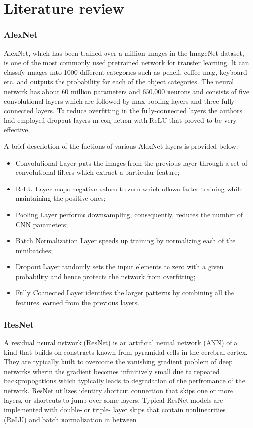 \documentclass[doc/report.tex]{subfiles}
\begin{document}
\section{Literature review}

\subsubsection{AlexNet}
AlexNet\cite{Alex}, which has been trained over a million images in the
ImageNet dataset, is one of the most commonly used pretrained network for
transfer learning. It can classify images into 1000 different categories such
as pencil, coffee mug, keyboard etc. and outputs the probability for each of
the object categories. The neural network has about 60 million parameters and
650,000 neurons and consists of five convolutional layers which are followed by
max-pooling layers and three fully-connected layers. To reduce overfitting in
the fully-connected layers the authors had  employed dropout layers in
conjuction with ReLU that proved to be very effective.

A brief descriotion of the fuctions of various AlexNet layers is provided below:

\begin{itemize}
	\item Convolutional Layer puts the images from the previous layer through a set of convolutional
filters which extract a particular feature;
	\item ReLU Layer maps negative values to zero which allows faster training while maintaining
the positive ones;
	\item Pooling Layer performs downsampling, consequently, reduces the number of CNN parameters;
    \item Batch Normalization Layer speeds up training by normalizing each of the minibatches;
    \item Dropout Layer randomly sets the input elements to zero with a given probability
and hence protects the network from overfitting;
    \item Fully Connected Layer identifies the larger patterns by combining all the features
learned from the previous layers.
\end{itemize}

\subsubsection{ResNet}
A residual neural network (ResNet) is an artificial neural network (ANN) of a kind that builds on constructs known from pyramidal cells in the cerebral cortex. They are typically built to overcome the vanishing gradient problem of deep networks wherin the gradient becomes infinitively small due to repeated backpropogations which typically leads to degradation of the perfromance of the network. ResNet utilizes identity shortcut connection that skips one or more layers, or shortcuts to jump over some layers. Typical ResNet models are implemented with double- or triple- layer skips that contain nonlinearities (ReLU) and batch normalization in between
\end{document}
